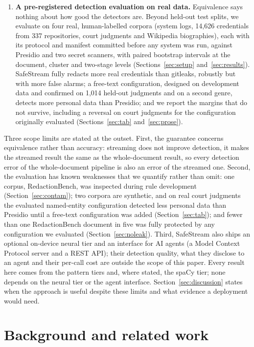 \documentclass[pdflatex,sn-mathphys-num]{sn-jnl}
\theoremstyle{\ssThmStyle}
\theoremstyle{\ssDefStyle}
\begin{document}
\begin{enumerate}
\item \textbf{A pre-registered detection evaluation on real data.} Equivalence says nothing about how good the detectors are. Beyond held-out test splits, we evaluate on four real, human-labelled corpora (system logs, 14,626 credentials from 337 repositories, court judgments and Wikipedia biographies), each with its protocol and manifest committed before any system was run, against Presidio and two secret scanners, with paired bootstrap intervals at the document, cluster and two-stage levels (Sections~\ref{sec:setup} and~\ref{sec:results}). SafeStream fully redacts more real credentials than gitleaks, robustly but with more false alarms; a free-text configuration, designed on development data and confirmed on 1,014 held-out judgments and on a second genre, detects more personal data than Presidio; and we report the margins that do not survive, including a reversal on court judgments for the configuration originally evaluated (Sections~\ref{sec:tab} and~\ref{sec:prose}).
\end{enumerate}

Three scope limits are stated at the outset. First, the guarantee concerns equivalence rather than accuracy: streaming does not improve detection, it makes the streamed result the same as the whole-document result, so every detection error of the whole-document pipeline is also an error of the streamed one. Second, the evaluation has known weaknesses that we quantify rather than omit: one corpus, RedactionBench, was inspected during rule development (Section~\ref{sec:contam}); two corpora are synthetic, and on real court judgments the evaluated named-entity configuration detected less personal data than Presidio until a free-text configuration was added (Section~\ref{sec:tab}); and fewer than one RedactionBench document in five was fully protected by any configuration we evaluated (Section~\ref{sec:noleak}). Third, SafeStream also ships an optional on-device neural tier and an interface for AI agents (a Model Context Protocol server and a REST API); their detection quality, what they disclose to an agent and their per-call cost are outside the scope of this paper. Every result here comes from the pattern tiers and, where stated, the spaCy tier; none depends on the neural tier or the agent interface. Section~\ref{sec:discussion} states when the approach is useful despite these limits and what evidence a deployment would need.

\section{Background and related work}\label{sec:related}
\end{document}
